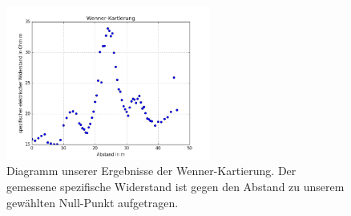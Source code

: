 \begin{figure}[h]
\centering
\includegraphics[width=0.6\textwidth]{fig/wennerkartierung.png}
\caption{Diagramm unserer Ergebnisse der Wenner-Kartierung. Der gemessene spezifische Widerstand ist gegen den Abstand zu unserem gewählten Null-Punkt aufgetragen.}
\label{abb:Wenner}
\end{figure}


